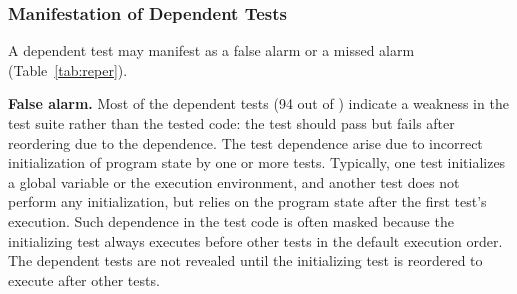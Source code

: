 


\subsubsection{Manifestation of Dependent Tests}
\label{sec:repercussion}



A dependent test may manifest as a false alarm or a missed alarm
(Table~\ref{tab:reper}).

\vspace{1mm}

\noindent \textbf{False alarm.} Most of
the dependent tests (94 out of \dtnum) indicate a weakness in the test suite rather than the
tested code:  
the test should pass but fails after reordering due to the dependence.
The test dependence arise due to incorrect initialization
of program state by one
or more tests. Typically, one test initializes
a global variable or the execution environment, and another
test does not perform any initialization, but
relies on the program state after the first test's execution.
Such dependence in the test code is often masked because
the initializing test always executes before other tests in the
default execution order. The dependent tests are not revealed
until the initializing test is reordered to execute
after other tests. 


